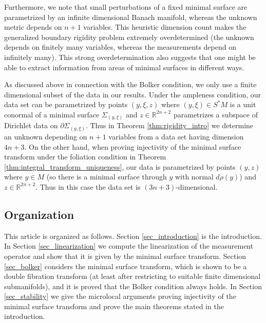 \documentclass[11pt]{amsart}
\theoremstyle{definition}
\numberwithin{equation}{section}
\newcommand{\mR}{\mathbb{R}}                    %
\newcommand{\p}{\partial}
\begin{document}
Furthermore, we note that small perturbations of a fixed minimal surface are parametrized by an infinite dimensional Banach manifold, whereas the unknown metric depends on $n+1$ variables. This heuristic dimension count makes the generalized boundary rigidity problem extremely overdetermined (the unknown depends on finitely many variables, whereas the measurements depend on infinitely many). This strong overdetermination also suggests that one might be able to extract information from areas of minimal surfaces in different ways.

As discussed above in connection with the Bolker condition, we only use a finite dimensional subset of the data in our results. Under the ampleness condition, our data set can be parametrized by points $(y,\xi,z)$ where $(y,\xi) \in S^* M$ is a unit conormal of a minimal surface $\Sigma_{(y,\xi)}$ and $z \in \mR^{2n+2}$ parametrizes a subspace of Dirichlet data on $\p \Sigma_{(y,\xi)}$. Thus in Theorem \ref{thm:rigidity_intro} we determine an unknown depending on $n+1$ variables from a data set having  dimension $4n+3$. On the other hand, when proving injectivity of the minimal surface transform under the foliation condition in Theorem \ref{thm:integral_transform_uniqueness}, our data is parametrized by points $(y,z)$ where $y \in M$ (so there is a minimal surface through $y$ with normal $d\rho(y)$) and $z \in \mR^{2n+2}$. Thus in this case the data set is $(3n+3)$-dimensional.









\subsection{Organization}

This article is organized as follows. Section \ref{sec_introduction} is the introduction. In Section \ref{sec_linearization} we compute the linearization of the measurement operator and show that it is given by the minimal surface transform. Section \ref{sec_bolker} considers the minimal surface transform, which is shown to be a double fibration transform (at least after restricting to suitable finite dimensional submanifolds), and it is proved that the Bolker condition always holds. In Section \ref{sec_stability} we give the microlocal arguments proving injectivity of the minimal surface transform and prove the main theorems stated in the introduction.
\end{document}
